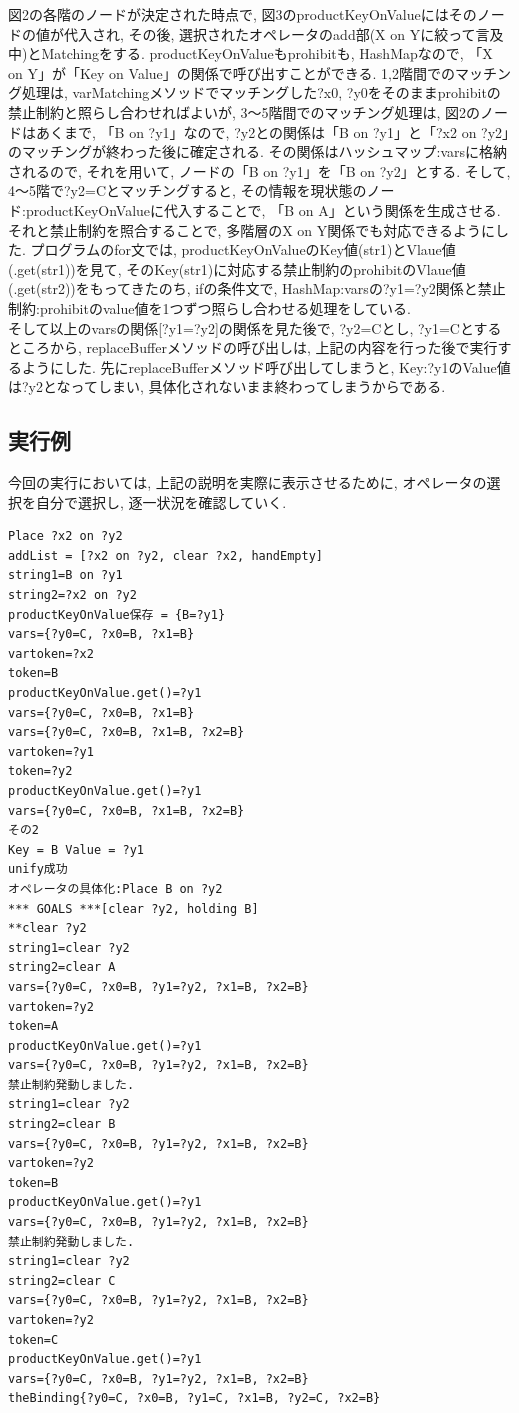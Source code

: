\documentclass[12pt]{jarticle}
\begin{document}
図2の各階のノードが決定された時点で, 図3のproductKeyOnValueにはそのノードの値が代入され, その後, 選択されたオペレータのadd部(X on Yに絞って言及中)とMatchingをする. productKeyOnValueもprohibitも, HashMapなので, 「X on Y」が「Key on Value」の関係で呼び出すことができる. 1,2階間でのマッチング処理は, varMatchingメソッドでマッチングした?x0, ?y0をそのままprohibitの禁止制約と照らし合わせればよいが, 3～5階間でのマッチング処理は, 図2のノードはあくまで, 「B on ?y1」なので, ?y2との関係は「B on ?y1」と「?x2 on ?y2」のマッチングが終わった後に確定される. その関係はハッシュマップ:varsに格納されるので, それを用いて, ノードの「B on ?y1」を「B on ?y2」とする. そして, 4～5階で?y2=Cとマッチングすると, その情報を現状態のノード:productKeyOnValueに代入することで, 「B on A」という関係を生成させる. それと禁止制約を照合することで, 多階層のX on Y関係でも対応できるようにした. プログラムのfor文では, productKeyOnValueのKey値(str1)とVlaue値(.get(str1))を見て, そのKey(str1)に対応する禁止制約のprohibitのVlaue値(.get(str2))をもってきたのち, ifの条件文で, HashMap:varsの{?y1=?y2}関係と禁止制約:prohibitのvalue値を1つずつ照らし合わせる処理をしている.\\

そして以上のvarsの関係[?y1=?y2]の関係を見た後で, ?y2=Cとし, ?y1=Cとするところから, replaceBufferメソッドの呼び出しは, 上記の内容を行った後で実行するようにした. 先にreplaceBufferメソッド呼び出してしまうと, Key:?y1のValue値は?y2となってしまい, 具体化されないまま終わってしまうからである.


\subsection{実行例}
今回の実行においては, 上記の説明を実際に表示させるために, オペレータの選択を自分で選択し, 逐一状況を確認していく.
\begin{lstlisting}[caption=3～5階層のマッチング, label=src:No1]
Place ?x2 on ?y2
addList = [?x2 on ?y2, clear ?x2, handEmpty]
string1=B on ?y1
string2=?x2 on ?y2
productKeyOnValue保存 = {B=?y1}
vars={?y0=C, ?x0=B, ?x1=B}
vartoken=?x2
token=B
productKeyOnValue.get()=?y1
vars={?y0=C, ?x0=B, ?x1=B}
vars={?y0=C, ?x0=B, ?x1=B, ?x2=B}
vartoken=?y1
token=?y2
productKeyOnValue.get()=?y1
vars={?y0=C, ?x0=B, ?x1=B, ?x2=B}
その2
Key = B Value = ?y1
unify成功
オペレータの具体化:Place B on ?y2
*** GOALS ***[clear ?y2, holding B]
**clear ?y2
string1=clear ?y2
string2=clear A
vars={?y0=C, ?x0=B, ?y1=?y2, ?x1=B, ?x2=B}
vartoken=?y2
token=A
productKeyOnValue.get()=?y1
vars={?y0=C, ?x0=B, ?y1=?y2, ?x1=B, ?x2=B}
禁止制約発動しました.
string1=clear ?y2
string2=clear B
vars={?y0=C, ?x0=B, ?y1=?y2, ?x1=B, ?x2=B}
vartoken=?y2
token=B
productKeyOnValue.get()=?y1
vars={?y0=C, ?x0=B, ?y1=?y2, ?x1=B, ?x2=B}
禁止制約発動しました.
string1=clear ?y2
string2=clear C
vars={?y0=C, ?x0=B, ?y1=?y2, ?x1=B, ?x2=B}
vartoken=?y2
token=C
productKeyOnValue.get()=?y1
vars={?y0=C, ?x0=B, ?y1=?y2, ?x1=B, ?x2=B}
theBinding{?y0=C, ?x0=B, ?y1=C, ?x1=B, ?y2=C, ?x2=B}
\end{lstlisting}
\end{document}

